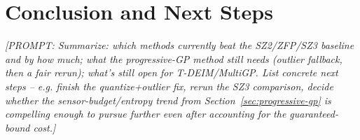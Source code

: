 \documentclass[11pt]{article}
\newcommand{\prompt}[1]{{\color{red}\itshape [PROMPT: #1]}\par\medskip}
\begin{document}
\section{Conclusion and Next Steps}
\label{sec:conclusion}

\prompt{Summarize: which methods currently beat the SZ2/ZFP/SZ3
baseline and by how much; what the progressive-GP method still needs
(outlier fallback, then a fair rerun); what's still open for T-DEIM/MultiGP.
List concrete next steps -- e.g. finish the quantize+outlier fix, rerun
the SZ3 comparison, decide whether the sensor-budget/entropy trend from
Section~\ref{sec:progressive-gp} is compelling enough to pursue further
even after accounting for the guaranteed-bound cost.}

\end{document}
